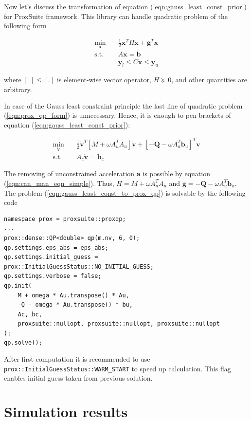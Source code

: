 Now let's discuss the transformation of equation 
(\ref{eqn:gauss_least_const_prior}) for ProxSuite framework. This library can 
handle quadratic problem of the following form

\begin{equation}
    \begin{aligned}
        \min_{\mathbf{x}} \quad & 
        \frac{1}{2} \mathbf{x}^T H \mathbf{x} + 
        \mathbf{g}^T \mathbf{x} \\
        \textrm{s.t.} \quad & A \mathbf{x} = \mathbf{b} \\
        & \mathbf{y}_l \leq C \mathbf{x} \leq \mathbf{y}_u  
    \end{aligned}
    \label{eqn:prox_qp_form}
\end{equation}

where $[.] \leq [.]$ is element-wise vector operator, $H \succeq 0$, and 
other quantities are arbitrary.

In case of the Gauss least constraint principle the last line of quadratic 
problem (\ref{eqn:prox_qp_form}) is unnecessary. Hence, it is enough 
to pen brackets of equation (\ref{eqn:gauss_least_const_prior}):

\begin{equation}
    \begin{aligned}
        \min_{\dot{\mathbf{v}}} \quad & 
        \frac{1}{2} \dot{\mathbf{v}}^T [M + \omega A_u^T A_u] \dot{\mathbf{v}} + 
        [-\mathbf{Q} - \omega A_u^T \mathbf{b}_u]^T \dot{\mathbf{v}} \\
        \textrm{s.t.} \quad & A_c \dot{\mathbf{v}} = \mathbf{b}_c
    \end{aligned}
    \label{eqn:gauss_least_const_to_prox_qp}
\end{equation}

The removing of unconstrained acceleration $\mathbf{a}$ is possible by equation 
(\ref{eqn:can_man_eqn_simple}). Thus, $H = M + \omega A_u^T A_u$ and 
$\mathbf{g} = -\mathbf{Q} - \omega A_u^T \mathbf{b}_u$. The problem 
(\ref{eqn:gauss_least_const_to_prox_qp}) is solvable by the following 
code

\begin{lstlisting}[caption={Quadratic problem solution}, label=snp:qp_sol]
namespace prox = proxsuite::proxqp;
...
prox::dense::QP<double> qp(m.nv, 6, 0);
qp.settings.eps_abs = eps_abs;
qp.settings.initial_guess = prox::InitialGuessStatus::NO_INITIAL_GUESS;
qp.settings.verbose = false;
qp.init(
    M + omega * Au.transpose() * Au,
    -Q - omega * Au.transpose() * bu,
    Ac, bc,
    proxsuite::nullopt, proxsuite::nullopt, proxsuite::nullopt
);
qp.solve();
\end{lstlisting}

After first computation it is recommended to use \\
\texttt{prox::InitialGuessStatus::WARM\_START} to speed up calculation. This 
flag enables initial guess taken from previous solution.

\section{Simulation results}
\label{sec:sim_results}

